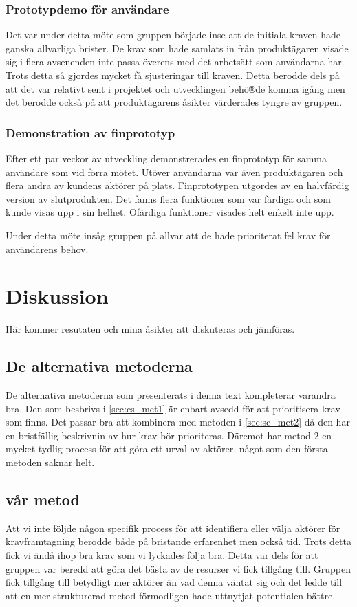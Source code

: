 \subsubsection{Prototypdemo för användare}
Det var under detta möte som gruppen började inse att de initiala kraven hade ganska allvarliga brister. De krav som hade samlats in från produktägaren visade sig i flera avsenenden inte passa överens med det arbetsätt som användarna har. Trots detta så gjordes mycket få sjusteringar till kraven. Detta berodde dels på att det var relativt sent i projektet och utvecklingen behö®de komma igång men det berodde också på att produktägarens åsikter värderades tyngre av gruppen.

\subsubsection{Demonstration av finprototyp}
Efter ett par veckor av utveckling demonstrerades en finprototyp för samma användare som vid förra mötet. Utöver användarna var även produktägaren och flera andra av kundens aktörer på plats. Finprototypen utgordes av en halvfärdig version av slutprodukten. Det fanns flera funktioner som var färdiga och som kunde visas upp i sin helhet. Ofärdiga funktioner visades helt enkelt inte upp.

Under detta möte insåg gruppen på allvar att de hade prioriterat fel krav för användarens behov.


\section{Diskussion}
Här kommer resutaten och mina åsikter att diskuteras och jämföras.

\subsection{De alternativa metoderna}
De alternativa metoderna som presenterats i denna text kompleterar varandra bra. Den som besbrivs i \ref{sec:cs_met1} är enbart avsedd för att prioritisera krav som finns. Det passar bra att kombinera med metoden i \ref{sec:sc_met2} då den har en bristfällig beskrivnin av hur krav bör prioriteras. Däremot har metod 2 en mycket tydlig process för att göra ett urval av aktörer, något som den första metoden saknar helt. 

\subsection{vår metod}
Att vi inte följde någon specifik process för att identifiera eller välja aktörer för kravframtagning berodde både på bristande erfarenhet men också tid. Trots detta fick vi ändå ihop bra krav som vi lyckades följa bra. Detta var dels för att gruppen var beredd att göra det bästa av de resurser vi fick tillgång till. Gruppen fick tillgång till betydligt mer aktörer än vad denna väntat sig och det ledde till att en mer strukturerad metod förmodligen hade uttnytjat potentialen bättre.

